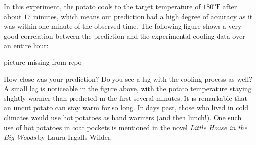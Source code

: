 \documentclass{ximera}
\begin{document}
In this experiment, the potato cools to the target temperature of $180^{\text{o}}\text{F}$ after about $17$ minutes, which means our prediction had a high degree of accuracy as it was within one minute of the observed time.  The following figure shows a very good correlation between the prediction and the experimental cooling data over an entire hour:
 
\begin{image}
picture missing from repo
\end{image}
 
How close was your prediction?  Do you see a lag with the cooling process as well?  A small lag is noticeable in the figure above, with the potato temperature staying slightly warmer than predicted in the first several minutes.  It is remarkable that an uncut potato can stay warm for so long.  In days past, those who lived in cold climates would use hot potatoes as hand warmers (and then lunch!).  One such use of hot potatoes in coat pockets is mentioned in the novel \textit{Little House in the Big Woods} by Laura Ingalls Wilder.
\end{document}
